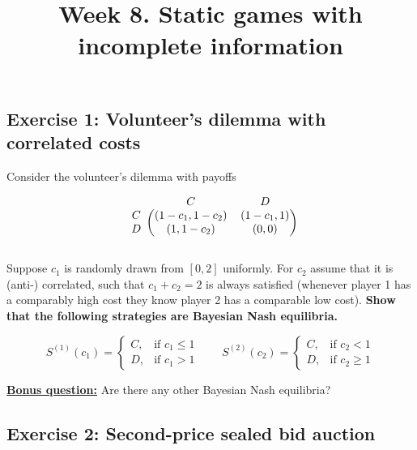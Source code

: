 \documentclass[10pt]{article}
\title{\textbf{Week 8.} Static games with incomplete information}
\date{}
\begin{document}
\maketitle
\vspace{-1cm}

\subsection*{Exercise 1: Volunteer's dilemma with correlated costs}

Consider the volunteer's dilemma with payoffs

\begin{equation*}
    \begin{blockarray}{ccc}
        & C & D \\
        \begin{block}{c(cc)}
            C & (1 - c_1, 1 - c_2) & (1 - c_1, 1) \\
            D & (1, 1 - c_2) & (0, 0) \\
        \end{block}
    \end{blockarray}
\end{equation*}

Suppose \(c_1\) is randomly drawn from \([0, 2]\) uniformly. For \(c_2\) assume
that it is (anti-) correlated, such that \(c_1 + c_2 = 2\) is always satisfied
(whenever player 1 has a comparably high cost they know player 2 has a
comparable low cost). \textbf{Show that the following strategies are Bayesian Nash
equilibria.}

\begin{equation*}
    S^{(1)}(c_1) = 
    \begin{cases}
        C,& \text{if } c_1 \leq 1\\
        D,              & \text{if } c_1 > 1
    \end{cases} \qquad
    S^{(2)}(c_2) = 
    \begin{cases}
        C,& \text{if } c_2 < 1\\
        D,              & \text{if } c_2 \geq 1
    \end{cases}
\end{equation*}

\underline{\textbf{Bonus question:}} Are there any other Bayesian Nash equilibria?

\subsection*{Exercise 2: Second-price sealed bid auction}
\end{document}
